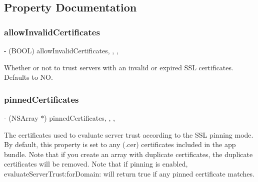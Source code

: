 \subsection{Property Documentation}
\mbox{\label{interface_a_f_security_policy_a4187dab7a2429bd032513b68934837e3}} 
\subsubsection{\texorpdfstring{allow\+Invalid\+Certificates}{allowInvalidCertificates}}
{\footnotesize\ttfamily -\/ (B\+O\+OL) allow\+Invalid\+Certificates\hspace{0.3cm}{\ttfamily [read]}, {\ttfamily [write]}, {\ttfamily [nonatomic]}, {\ttfamily [assign]}}

Whether or not to trust servers with an invalid or expired S\+SL certificates. Defaults to {\ttfamily NO}. \mbox{\label{interface_a_f_security_policy_a7ceb752aec14fd94d31ed428477cec5d}} 
\subsubsection{\texorpdfstring{pinned\+Certificates}{pinnedCertificates}}
{\footnotesize\ttfamily -\/ (N\+S\+Array $\ast$) pinned\+Certificates\hspace{0.3cm}{\ttfamily [read]}, {\ttfamily [write]}, {\ttfamily [nonatomic]}, {\ttfamily [strong]}}

The certificates used to evaluate server trust according to the S\+SL pinning mode. By default, this property is set to any ({\ttfamily .cer}) certificates included in the app bundle. Note that if you create an array with duplicate certificates, the duplicate certificates will be removed. Note that if pinning is enabled, {\ttfamily evaluate\+Server\+Trust\+:for\+Domain\+:} will return true if any pinned certificate matches. \mbox{\label{interface_a_f_security_policy_ae9a77137a0fcecbb05ac30e5e1ce8092}} 
